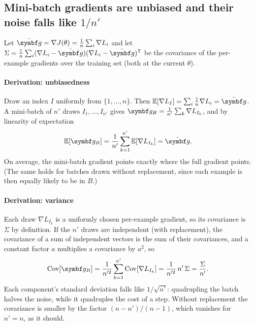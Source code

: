 \documentclass[11pt]{article}
\newcommand{\gvec}{\vect{g}}
\begin{document}
\subsection{\texorpdfstring{Mini-batch gradients are unbiased and their noise falls like $1/n'$}{Mini-batch gradients are unbiased and their noise falls like 1/n'}}

Let $\bar{\gvec} = \nabla J(\theta) = \frac1n\sum_i \nabla L_i$ and let
$\Sigma = \frac1n\sum_i (\nabla L_i - \bar{\gvec})(\nabla L_i - \bar{\gvec})\T$ be the covariance of the per-example
gradients over the training set (both at the current $\theta$).

\paragraph{Derivation: unbiasedness} Draw an index $I$ uniformly from $\{1, \dots, n\}$. Then
$\E[\nabla L_I] = \sum_i \frac1n \nabla L_i = \bar{\gvec}$. A mini-batch of $n'$ draws $I_1, \dots, I_{n'}$ gives
$\gvec_B = \frac{1}{n'}\sum_k \nabla L_{I_k}$, and by linearity of expectation
\[
  \E[\gvec_B] = \frac{1}{n'}\sum_{k=1}^{n'} \E[\nabla L_{I_k}] = \bar{\gvec} .
\]
On average, the mini-batch gradient points exactly where the full gradient points. (The same holds for batches drawn
without replacement, since each example is then equally likely to be in $B$.)

\paragraph{Derivation: variance} Each draw $\nabla L_{I_k}$ is a uniformly chosen per-example gradient, so its
covariance is $\Sigma$ by definition. If the $n'$ draws are independent (with replacement), the covariance of a sum of
independent vectors is the sum of their covariances, and a constant factor $a$ multiplies a covariance by $a^2$, so
\[
  \Cov[\gvec_B] = \frac{1}{n'^2}\sum_{k=1}^{n'} \Cov[\nabla L_{I_k}] = \frac{1}{n'^2}\, n'\,\Sigma = \frac{\Sigma}{n'} .
\]
Each component's standard deviation falls like $1/\sqrt{n'}$: quadrupling the batch halves the noise, while it
quadruples the cost of a step. Without replacement the covariance is smaller by the factor $(n - n')/(n - 1)$, which
vanishes for $n' = n$, as it should.
\end{document}
